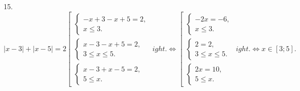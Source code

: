 15. $|x-3|+|x-5|=2 \left[\begin{array}{l}\begin{cases} -x+3-x+5=2,\\ x\leqslant 3.\end{cases}\\
\begin{cases} x-3-x+5=2,\\ 3\leqslant x\leqslant 5 .\end{cases}\\\begin{cases} x-3+x-5=2,\\ 5\leqslant x.\end{cases}\end{array}
ight.\Leftrightarrow
\left[\begin{array}{l}\begin{cases} -2x=-6,\\ x\leqslant 3.\end{cases}\\
\begin{cases} 2=2,\\ 3\leqslant x\leqslant 5 .\end{cases}\\\begin{cases} 2x=10,\\ 5\leqslant x.\end{cases}\end{array}
ight.\Leftrightarrow x\in[3;5].$\\
